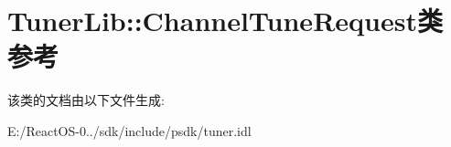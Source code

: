 \hypertarget{class_tuner_lib_1_1_channel_tune_request}{}\section{Tuner\+Lib\+:\+:Channel\+Tune\+Request类 参考}
\label{class_tuner_lib_1_1_channel_tune_request}


该类的文档由以下文件生成\+:\begin{DoxyCompactItemize}
\item 
E\+:/\+React\+O\+S-\/0../sdk/include/psdk/tuner.\+idl\end{DoxyCompactItemize}
